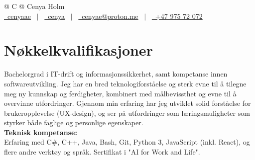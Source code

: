\documentclass[a4paper,12pt]{article}
\begin{document}
\pagestyle{empty} 



\begin{tabularx}{\linewidth}{@{} C @{}}
\Huge{Cenya Holm} \\[7.5pt]
\href{https://github.com/cenyaae/}{\raisebox{-0.05\height}\faGithub\ cenyaae} \ $|$ \
\href{https://linkedin.com/in/cenya}{\raisebox{-0.05\height}\faLinkedin\ cenya} \ $|$ \ 
\href{mailto:cenyae@proton.me}{\raisebox{-0.05\height}\faEnvelope \ cenyae@proton.me} \ $|$ \ 
\href{tel:+004797572072}{\raisebox{-0.05\height}\faMobile \ +47 975 72 072} \\
\end{tabularx}


\section{Nøkkelkvalifikasjoner}
Bachelorgrad i IT-drift og informasjonssikkerhet, samt kompetanse innen softwareutvikling. Jeg har en bred teknologiforståelse og sterk evne til å tilegne meg ny kunnskap og ferdigheter, kombinert med målbevissthet og evne til å overvinne utfordringer.
Gjennom min erfaring har jeg utviklet solid forståelse for brukeropplevelse (UX-design), og ser på utfordringer som læringsmuligheter som styrker både faglige og personlige egenskaper. \\
\textbf{Teknisk kompetanse:} \\
Erfaring med C\#, C++, Java, Bash, Git, Python 3, JavaScript (inkl. React), og flere andre verktøy og språk. Sertifikat i "AI for Work and Life".\\
\end{document}
